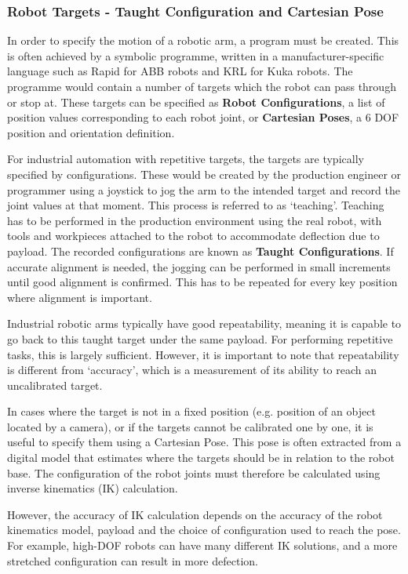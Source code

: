 \documentclass[11pt]{book}
\begin{document}
\subsubsection{Robot Targets - Taught Configuration and Cartesian Pose}

In order to specify the motion of a robotic arm, a program must be created. This is often achieved by a symbolic programme, written in a manufacturer-specific language such as Rapid for ABB robots and KRL for Kuka robots. The programme would contain a number of targets which the robot can pass through or stop at. These targets can be specified as \textbf{Robot Configurations}, a list of position values corresponding to each robot joint, or \textbf{Cartesian Poses}, a 6 DOF position and orientation definition.

For industrial automation with repetitive targets, the targets are typically specified by configurations. These would be created by the production engineer or programmer using a joystick to jog the arm to the intended target and record the joint values at that moment. This process is referred to as ‘teaching’. Teaching has to be performed in the production environment using the real robot, with tools and workpieces attached to the robot to accommodate deflection due to payload. The recorded configurations are known as \textbf{Taught Configurations}. If accurate alignment is needed, the jogging can be performed in small increments until good alignment is confirmed. This has to be repeated for every key position where alignment is important. 

Industrial robotic arms typically have good repeatability, meaning it is capable to go back to this taught target under the same payload. For performing repetitive tasks, this is largely sufficient. However, it is important to note that repeatability is different from ‘accuracy’, which is a measurement of its ability to reach an uncalibrated target. 

In cases where the target is not in a fixed position (e.g. position of an object located by a camera), or if the targets cannot be calibrated one by one, it is useful to specify them using a Cartesian Pose. This pose is often extracted from a digital model that estimates where the targets should be in relation to the robot base. The configuration of the robot joints must therefore be calculated using inverse kinematics (IK) calculation. 

However, the accuracy of IK calculation depends on the accuracy of the robot kinematics model, payload and the choice of configuration used to reach the pose. For example, high-DOF robots can have many different IK solutions, and a more stretched configuration can result in more defection. 
\end{document}
